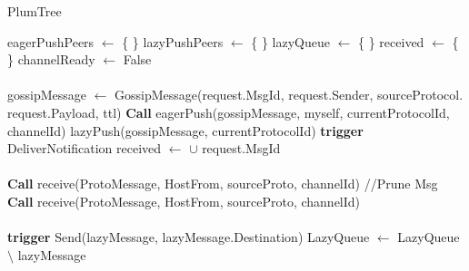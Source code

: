 \begin{algorithm}
   \caption{PlumTree}
    \begin{algorithmic}[1]
        \State eagerPushPeers $\leftarrow$ \{ \}
        \State lazyPushPeers $\leftarrow$ \{ \}
        \State lazyQueue $\leftarrow$ \{ \}
        \State received $\leftarrow$ \{ \}
        \State channelReady $\leftarrow$ False
	  \EndFunction
    \paragraph{}
    
        \State gossipMessage $\leftarrow$ GossipMessage(request.MsgId, request.Sender, sourceProtocol. request.Payload, ttl)
        \State \textbf{Call} eagerPush(gossipMessage, myself, currentProtocolId, channelId)
         \State lazyPush(gossipMessage, currentProtocolId)
         \State \textbf{trigger} DeliverNotification
         \State received $\leftarrow$ $\cup$ request.MsgId
        \EndIf
\EndFunction

    \paragraph{}


\paragraph{}

        \State \textbf{Call} receive(ProtoMessage, HostFrom, sourceProto, channelId) //Prune Msg
    \Else
        \State \textbf{Call} receive(ProtoMessage, HostFrom, sourceProto, channelId)
    \EndIf
\EndFunction

    \paragraph{}

    \State \textbf{trigger} Send(lazyMessage, lazyMessage.Destination)
    \State LazyQueue $\leftarrow$ LazyQueue  $\setminus$ lazyMessage 
    \EndFor
\EndFunction

    \paragraph{}



\end{algorithmic}
\end{algorithm}
